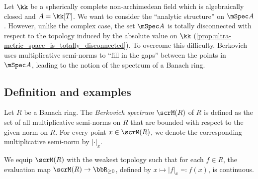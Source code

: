 



Let \(\kk\) be a spherically complete non-archimedean field which is algebraically closed and \(A = \kk[T]\).
We want to consider the ``analytic structure'' on \(\mSpec A\).
However, unlike the complex case, the set \(\mSpec A\) is totally disconnected with respect to the topology induced by the absolute value on \(\kk\) (\cref{prop:ultra-metric_space_is_totally_disconnected}).
To overcome this difficulty, Berkovich uses multiplicative semi-norms to ``fill in the gaps'' between the points in \(\mSpec A\), leading to the notion of the spectrum of a Banach ring.


\subsection{Definition and examples}

\begin{definition}\label{def:spectrum_of_Banach_rings}
	Let \(R\) be a Banach ring.
	The \emph{Berkovich spectrum} \(\scrM(R)\) of \(R\) is defined as the set of all multiplicative semi-norms on \(R\) that are bounded with respect to the given norm on \(R\).
	For every point \(x \in \scrM(R)\), we denote the corresponding multiplicative semi-norm by \(|\cdot|_x\).

	We equip \(\scrM(R)\) with the weakest topology such that for each \(f \in R\), the evaluation map \(\scrM(R) \to \bbR_{\geq 0}\), defined by \(x \mapsto |f|_x\eqqcolon f(x)\), is continuous.
\end{definition}

